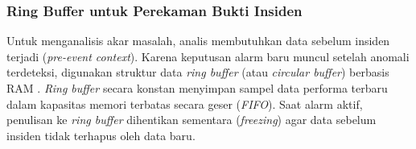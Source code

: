 \subsubsection{Ring Buffer untuk Perekaman Bukti Insiden}
Untuk menganalisis akar masalah, analis membutuhkan data sebelum insiden terjadi (\textit{pre-event context}). Karena keputusan alarm baru muncul setelah anomali terdeteksi, digunakan struktur data \textit{ring buffer} (atau \textit{circular buffer}) berbasis RAM \cite{marwedel2021}. \textit{Ring buffer} secara konstan menyimpan sampel data performa terbaru dalam kapasitas memori terbatas secara geser (\textit{FIFO}). Saat alarm aktif, penulisan ke \textit{ring buffer} dihentikan sementara (\textit{freezing}) agar data sebelum insiden tidak terhapus oleh data baru.